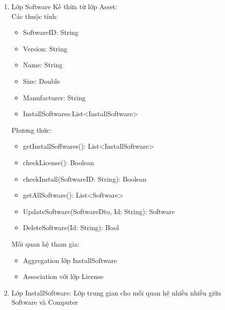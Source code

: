 \begin{enumerate}
\begin{itemize}[label=--]
        \item GetInstalledSoftwares():PageResult<InstalledSoftware>
        \item UpdateComputer(Computer: ComputerDto, Id: String): Computer 
    \end{itemize}
    Mối quan hệ tham gia:
    \begin{itemize}[label=--]
        \item Aggregation với lớp Hardware, lớp InstallSoftware
        \item Aggregation với lớp Threshold
        \item Composition với lớp Alert, một máy tính có thể có nhiều Alert
    \end{itemize}
    \item Lớp Software Kế thừa từ lớp Asset:\\
    Các thuộc tính:
    \begin{itemize}[label=--]
        \item SoftwareID: String
        \item Version: String
        \item Name: String
        \item Size: Double
        \item Manufacturer: String
        \item InstallSoftwares:List<InstallSoftware>
    \end{itemize}
    Phương thức:
    \begin{itemize}[label=--]
        \item getInstallSoffwares(): List<InstallSoftware>
        \item  checkLicense(): Boolean
        \item  checkInstall(SoftwareID: String): Boolean
        \item  getAllSoftware(): List<Software>
        \item  UpdateSoftware(SoftwareDto, Id: String): Software 
        \item  DeleteSoftware(Id: String): Bool
    \end{itemize}
    Mối quan hệ tham gia:
    \begin{itemize}[label=--]
        \item Aggregation lớp InstallSoftware
        \item Association với lớp License
    \end{itemize}
    \item Lớp InstallSoftware: Lớp trung gian cho mối quan hệ nhiều nhiều giữa Software và Computer

\end{enumerate}
